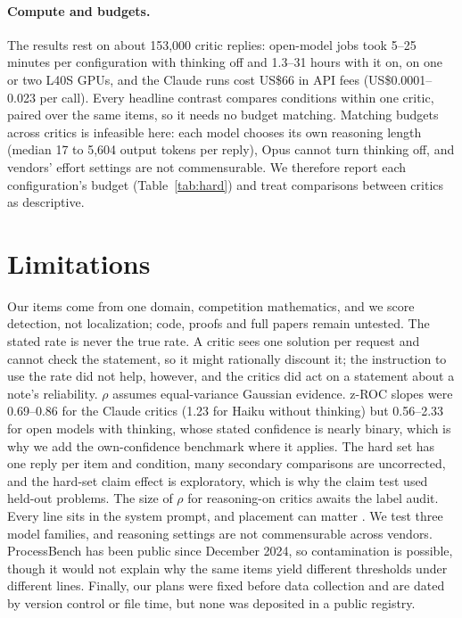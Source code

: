 \documentclass[letterpaper]{article} %
\begin{document}
\paragraph{Compute and budgets.} The results rest on about 153,000 critic replies: open-model jobs took 5--25 minutes per configuration with thinking off and 1.3--31 hours with it on, on one or two L40S GPUs, and the Claude runs cost US\$66 in API fees (US\$0.0001--0.023 per call). Every headline contrast compares conditions within one critic, paired over the same items, so it needs no budget matching. Matching budgets across critics is infeasible here: each model chooses its own reasoning length (median 17 to 5,604 output tokens per reply), Opus cannot turn thinking off, and vendors' effort settings are not commensurable. We therefore report each configuration's budget (Table~\ref{tab:hard}) and treat comparisons between critics as descriptive.

\section{Limitations}

Our items come from one domain, competition mathematics, and we score detection, not localization; code, proofs and full papers remain untested. The stated rate is never the true rate. A critic sees one solution per request and cannot check the statement, so it might rationally discount it; the instruction to use the rate did not help, however, and the critics did act on a statement about a note's reliability. $\rho$ assumes equal-variance Gaussian evidence. z-ROC slopes were 0.69--0.86 for the Claude critics (1.23 for Haiku without thinking) but 0.56--2.33 for open models with thinking, whose stated confidence is nearly binary, which is why we add the own-confidence benchmark where it applies. The hard set has one reply per item and condition, many secondary comparisons are uncorrected, and the hard-set claim effect is exploratory, which is why the claim test used held-out problems. The size of $\rho$ for reasoning-on critics awaits the label audit. Every line sits in the system prompt, and placement can matter \citep{brown2026grounded,ni2026position}. We test three model families, and reasoning settings are not commensurable across vendors. ProcessBench has been public since December 2024, so contamination is possible, though it would not explain why the same items yield different thresholds under different lines. Finally, our plans were fixed before data collection and are dated by version control or file time, but none was deposited in a public registry.
\end{document}
